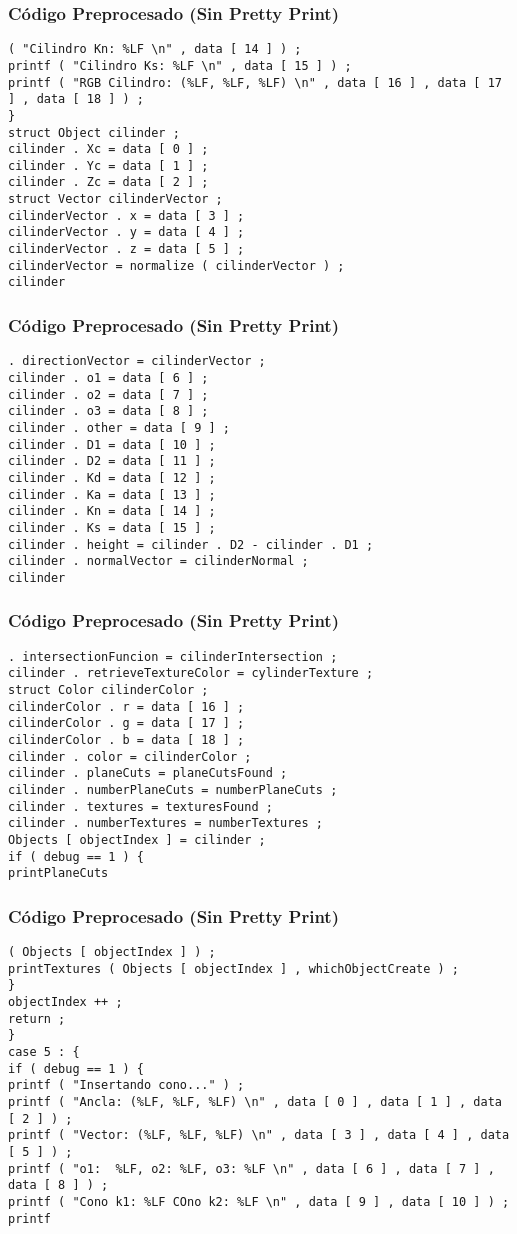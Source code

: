 \documentclass{beamer}
\begin{document}
\begin{frame}[fragile]
\frametitle{C\'odigo Preprocesado (Sin Pretty Print)}
\begin{lstlisting}[style=CStyle]
( "Cilindro Kn: %LF \n" , data [ 14 ] ) ; 
printf ( "Cilindro Ks: %LF \n" , data [ 15 ] ) ; 
printf ( "RGB Cilindro: (%LF, %LF, %LF) \n" , data [ 16 ] , data [ 17 ] , data [ 18 ] ) ; 
} 
struct Object cilinder ; 
cilinder . Xc = data [ 0 ] ; 
cilinder . Yc = data [ 1 ] ; 
cilinder . Zc = data [ 2 ] ; 
struct Vector cilinderVector ; 
cilinderVector . x = data [ 3 ] ; 
cilinderVector . y = data [ 4 ] ; 
cilinderVector . z = data [ 5 ] ; 
cilinderVector = normalize ( cilinderVector ) ; 
cilinder \end{lstlisting}
\end{frame}
\begin{frame}[fragile]
\frametitle{C\'odigo Preprocesado (Sin Pretty Print)}
\begin{lstlisting}[style=CStyle]
. directionVector = cilinderVector ; 
cilinder . o1 = data [ 6 ] ; 
cilinder . o2 = data [ 7 ] ; 
cilinder . o3 = data [ 8 ] ; 
cilinder . other = data [ 9 ] ; 
cilinder . D1 = data [ 10 ] ; 
cilinder . D2 = data [ 11 ] ; 
cilinder . Kd = data [ 12 ] ; 
cilinder . Ka = data [ 13 ] ; 
cilinder . Kn = data [ 14 ] ; 
cilinder . Ks = data [ 15 ] ; 
cilinder . height = cilinder . D2 - cilinder . D1 ; 
cilinder . normalVector = cilinderNormal ; 
cilinder \end{lstlisting}
\end{frame}
\begin{frame}[fragile]
\frametitle{C\'odigo Preprocesado (Sin Pretty Print)}
\begin{lstlisting}[style=CStyle]
. intersectionFuncion = cilinderIntersection ; 
cilinder . retrieveTextureColor = cylinderTexture ; 
struct Color cilinderColor ; 
cilinderColor . r = data [ 16 ] ; 
cilinderColor . g = data [ 17 ] ; 
cilinderColor . b = data [ 18 ] ; 
cilinder . color = cilinderColor ; 
cilinder . planeCuts = planeCutsFound ; 
cilinder . numberPlaneCuts = numberPlaneCuts ; 
cilinder . textures = texturesFound ; 
cilinder . numberTextures = numberTextures ; 
Objects [ objectIndex ] = cilinder ; 
if ( debug == 1 ) { 
printPlaneCuts \end{lstlisting}
\end{frame}
\begin{frame}[fragile]
\frametitle{C\'odigo Preprocesado (Sin Pretty Print)}
\begin{lstlisting}[style=CStyle]
( Objects [ objectIndex ] ) ; 
printTextures ( Objects [ objectIndex ] , whichObjectCreate ) ; 
} 
objectIndex ++ ; 
return ; 
} 
case 5 : { 
if ( debug == 1 ) { 
printf ( "Insertando cono..." ) ; 
printf ( "Ancla: (%LF, %LF, %LF) \n" , data [ 0 ] , data [ 1 ] , data [ 2 ] ) ; 
printf ( "Vector: (%LF, %LF, %LF) \n" , data [ 3 ] , data [ 4 ] , data [ 5 ] ) ; 
printf ( "o1:  %LF, o2: %LF, o3: %LF \n" , data [ 6 ] , data [ 7 ] , data [ 8 ] ) ; 
printf ( "Cono k1: %LF COno k2: %LF \n" , data [ 9 ] , data [ 10 ] ) ; 
printf \end{lstlisting}
\end{frame}
\end{document}
